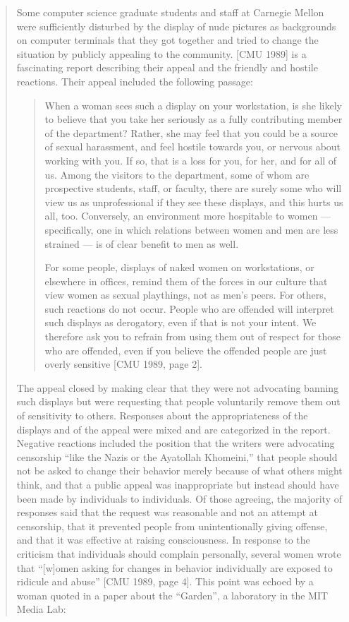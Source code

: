 \begin{quote}
Some computer science graduate students and staff at Carnegie
Mellon were sufficiently disturbed by the display of nude pictures as backgrounds on computer terminals that they got together and tried to change the situation by publicly appealing
to the community. [CMU 1989] is a fascinating report describing their appeal and the friendly and hostile reactions. Their
appeal included the following passage:

\begin{quote}
    When a woman sees such a display on your workstation, is she likely to believe that you take her
    seriously as a fully contributing member of the department? Rather, she may feel that you could be
    a source of sexual harassment, and feel hostile towards you, or nervous about working with you. If
    so, that is a loss for you, for her, and for all of
    us.  Among the visitors to the department, some
    of whom are prospective students, staff, or faculty,
    there are surely some who will view us as unprofessional if they see these displays, and this hurts
    us all, too. Conversely, an environment more hospitable to women --- specifically, one in which relations between women and men are less strained ---
    is of clear benefit to men as well.

    For some people, displays of naked women on workstations, or elsewhere in offices, remind them of the
    forces in our culture that view women as sexual
    playthings, not as men's peers.  For others, such
    reactions do not occur.  People who are offended
    will interpret such displays as derogatory, even if
    that is not your intent. We therefore ask you to refrain from using them out of respect for those who
    are offended, even if you believe the offended people
    are just overly sensitive [CMU 1989, page 2].

\end{quote}

The appeal closed by making clear that they were not advocating banning such displays but were requesting that people
voluntarily remove them out of sensitivity to others. Responses
about the appropriateness of the displays and of the appeal
were mixed and are categorized in the report. Negative reactions included the position that the writers were advocating
censorship ``like the Nazis or the Ayatollah Khomeini,'' that
people should not be asked to change their behavior merely
because of what others might think, and that a public appeal
was inappropriate but instead should have been made by individuals to individuals.  Of those agreeing, the majority of
responses said that the request was reasonable and not an attempt at censorship, that it prevented people from unintentionally giving offense, and that it was effective at raising consciousness. In response to the criticism that individuals should
complain personally, several women wrote that ``[w]omen asking for changes in behavior individually are exposed to ridicule
and abuse'' [CMU 1989, page 4]. This point was echoed by a
woman quoted in a paper about the ``Garden'', a laboratory in
the MIT Media Lab:


\end{quote}
